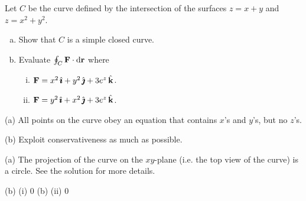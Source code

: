 \begin{question}[M317 2010A] %
Let $C$ be the curve defined by the intersection of the surfaces 
$z = x + y$ and $z = x^2 + y^2$.
\begin{enumerate}[(a)]
\item
Show that $C$ is a simple closed curve.
\item
Evaluate $\oint_C \mathbf{F} \cdot \mathrm{d}\mathbf{r}$ where
\begin{enumerate}[(i)]
\item
 $\mathbf{F} = x^2\,\hat{\pmb{\imath}} + y^2\,\hat{\pmb{\jmath}} + 3 e^z\,\hat{\mathbf{k}}$.
\item 
  $\mathbf{F} = y^2\,\hat{\pmb{\imath}} + x^2\,\hat{\pmb{\jmath}} + 3 e^z\,\hat{\mathbf{k}}$.
\end{enumerate}
\end{enumerate}
\end{question}

\begin{hint} 
(a) All points on the curve obey an equation that contains $x$'s and $y$'s,
but no $z$'s.

(b) Exploit conservativeness as much as possible.
\end{hint}

\begin{answer} 
(a) The projection of the curve on the $xy$-plane (i.e. the top view of the curve) is a circle. See the solution for more details.

(b) (i) $0$\qquad
(b) (ii) $0$
\end{answer}

